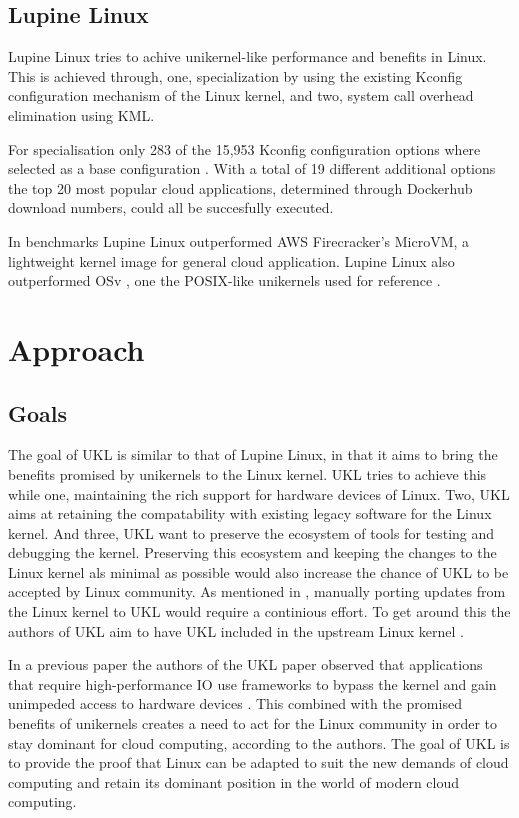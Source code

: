 \documentclass[10pt,twocolumn,a4paper]{article}
\begin{document}
  \subsection{Lupine Linux}
    Lupine Linux tries to achive unikernel-like performance and benefits in Linux.
    This is achieved through, one, specialization by using the existing Kconfig 
    configuration mechanism of the Linux kernel, 
    and two, system call overhead elimination using KML.

    For specialisation only 283 of the 15,953 Kconfig configuration options where
    selected as a base configuration \cite{kuo20}.
    With a total of 19 different additional options the top 20 most popular cloud applications,
    determined through Dockerhub download numbers, could all be succesfully executed.

    In benchmarks Lupine Linux outperformed AWS Firecracker's MicroVM, a lightweight 
    kernel image for general cloud application. 
    Lupine Linux also outperformed OSv \cite{osv}, 
    one the POSIX-like unikernels used for reference \cite{kuo20}.

\section{Approach}\label{sec:approach}
  \subsection{Goals}
    The goal of UKL is similar to that of Lupine Linux, in that it aims
    to bring the benefits promised by unikernels to the Linux kernel.
    UKL tries to achieve this while one, maintaining the rich support for hardware devices of Linux.
    Two, UKL aims at retaining the compatability with existing legacy software for the Linux kernel.
    And three, UKL want to preserve the ecosystem of tools for testing and debugging the kernel.
    Preserving this ecosystem and keeping the changes to the Linux kernel als minimal as possible
    would also increase the chance of UKL to be accepted by Linux community.
    As mentioned in , manually porting updates from
    the Linux kernel to UKL would require a continious effort.
    To get around this the authors of UKL aim to have UKL included in the upstream Linux kernel
    \cite{ukl-redhat-post}.

    In a previous paper \cite{raza19} the authors of the UKL paper \cite{raza23}
    observed that applications that require high-performance IO use frameworks
    to bypass the kernel and gain unimpeded access to hardware devices \cite{raza19}.
    This combined with the promised benefits of unikernels creates a need to act
    for the Linux community in order to stay dominant for cloud computing, according to the authors.
    The goal of UKL is to provide the proof that Linux can be adapted to suit the new demands of
    cloud computing and retain its dominant position in the world of modern cloud computing.
\end{document}

